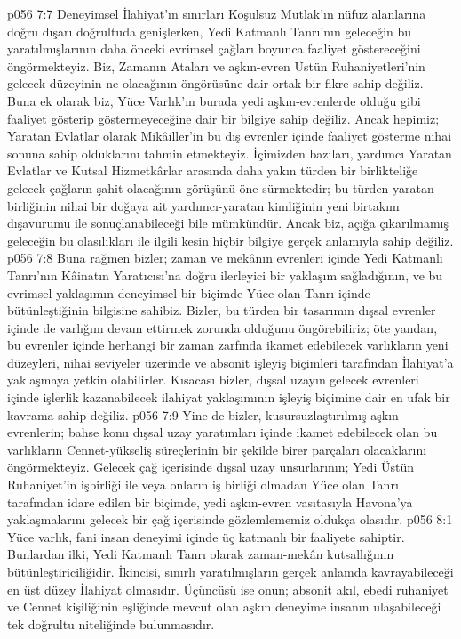 \vs p056 7:7 Deneyimsel İlahiyat’ın sınırları Koşulsuz Mutlak’ın nüfuz alanlarına doğru dışarı doğrultuda genişlerken, Yedi Katmanlı Tanrı’nın geleceğin bu yaratılmışlarının daha önceki evrimsel çağları boyunca faaliyet göstereceğini öngörmekteyiz. Biz, Zamanın Ataları ve aşkın\hyp{}evren Üstün Ruhaniyetleri’nin gelecek düzeyinin ne olacağının öngörüsüne dair ortak bir fikre sahip değiliz. Buna ek olarak biz, Yüce Varlık’ın burada yedi aşkın\hyp{}evrenlerde olduğu gibi faaliyet gösterip göstermeyeceğine dair bir bilgiye sahip değiliz. Ancak hepimiz; Yaratan Evlatlar olarak Mikâiller’in bu dış evrenler içinde faaliyet gösterme nihai sonuna sahip olduklarını tahmin etmekteyiz. İçimizden bazıları, yardımcı Yaratan Evlatlar ve Kutsal Hizmetkârlar arasında daha yakın türden bir birlikteliğe gelecek çağların şahit olacağının görüşünü öne sürmektedir; bu türden yaratan birliğinin nihai bir doğaya ait yardımcı\hyp{}yaratan kimliğinin yeni birtakım dışavurumu ile sonuçlanabileceği bile mümkündür. Ancak biz, açığa çıkarılmamış geleceğin bu olasılıkları ile ilgili kesin hiçbir bilgiye gerçek anlamıyla sahip değiliz.
\vs p056 7:8 Buna rağmen bizler; zaman ve mekânın evrenleri içinde Yedi Katmanlı Tanrı’nın Kâinatın Yaratıcısı’na doğru ilerleyici bir yaklaşım sağladığının, ve bu evrimsel yaklaşımın deneyimsel bir biçimde Yüce olan Tanrı içinde bütünleştiğinin bilgisine sahibiz. Bizler, bu türden bir tasarımın dışsal evrenler içinde de varlığını devam ettirmek zorunda olduğunu öngörebiliriz; öte yandan, bu evrenler içinde herhangi bir zaman zarfında ikamet edebilecek varlıkların yeni düzeyleri, nihai seviyeler üzerinde ve absonit işleyiş biçimleri tarafından İlahiyat’a yaklaşmaya yetkin olabilirler. Kısacası bizler, dışsal uzayın gelecek evrenleri içinde işlerlik kazanabilecek ilahiyat yaklaşımının işleyiş biçimine dair en ufak bir kavrama sahip değiliz.
\vs p056 7:9 Yine de bizler, kusursuzlaştırılmış aşkın\hyp{}evrenlerin; bahse konu dışsal uzay yaratımları içinde ikamet edebilecek olan bu varlıkların Cennet\hyp{}yükseliş süreçlerinin bir şekilde birer parçaları olacaklarını öngörmekteyiz. Gelecek çağ içerisinde dışsal uzay unsurlarının; Yedi Üstün Ruhaniyet’in işbirliği ile veya onların iş birliği olmadan Yüce olan Tanrı tarafından idare edilen bir biçimde, yedi aşkın\hyp{}evren vasıtasıyla Havona’ya yaklaşmalarını gelecek bir çağ içerisinde gözlemlememiz oldukça olasıdır.
\vs p056 8:1 Yüce varlık, fani insan deneyimi içinde üç katmanlı bir faaliyete sahiptir. Bunlardan ilki, Yedi Katmanlı Tanrı olarak zaman\hyp{}mekân kutsallığının bütünleştiriciliğidir. İkincisi, sınırlı yaratılmışların gerçek anlamda kavrayabileceği en üst düzey İlahiyat olmasıdır. Üçüncüsü ise onun; absonit akıl, ebedi ruhaniyet ve Cennet kişiliğinin eşliğinde mevcut olan aşkın deneyime insanın ulaşabileceği tek doğrultu niteliğinde bulunmasıdır.

